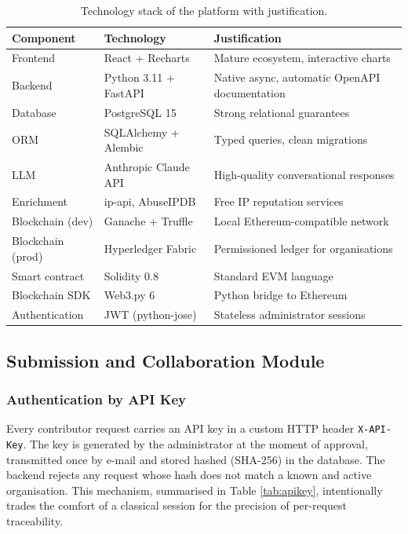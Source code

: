 \documentclass[12pt,a4paper,oneside]{book}
\begin{document}
{{\begin{table}[!h]
\caption{Technology stack of the platform with justification.}
\label{tab:stack}
\centering
\renewcommand{\arraystretch}{1.4}
\begin{tabular}{| C{.20\textwidth} | C{.25\textwidth} | p{.40\textwidth} |}
\hline
\textbf{Component} & \textbf{Technology} & \textbf{Justification} \\
\hline\hline
Frontend         & React + Recharts        & \nohyphens{Mature ecosystem, interactive charts} \\
\hline
Backend          & Python 3.11 + FastAPI   & \nohyphens{Native async, automatic OpenAPI documentation} \\
\hline
Database         & PostgreSQL 15           & \nohyphens{Strong relational guarantees} \\
\hline
ORM              & SQLAlchemy + Alembic    & \nohyphens{Typed queries, clean migrations} \\
\hline
LLM              & Anthropic Claude API    & \nohyphens{High-quality conversational responses} \\
\hline
Enrichment       & ip-api, AbuseIPDB       & \nohyphens{Free IP reputation services} \\
\hline
Blockchain (dev) & Ganache + Truffle       & \nohyphens{Local Ethereum-compatible network} \\
\hline
Blockchain (prod)& Hyperledger Fabric      & \nohyphens{Permissioned ledger for organisations} \\
\hline
Smart contract   & Solidity 0.8            & \nohyphens{Standard EVM language} \\
\hline
Blockchain SDK   & Web3.py 6               & \nohyphens{Python bridge to Ethereum} \\
\hline
Authentication   & JWT (python-jose)       & \nohyphens{Stateless administrator sessions} \\
\hline
\end{tabular}
\end{table}

\subsection{Submission and Collaboration Module}

\subsubsection{Authentication by API Key}
Every contributor request carries an API key in a custom HTTP header
\texttt{X-API-Key}. The key is generated by the administrator at the moment
of approval, transmitted once by e-mail and stored hashed (SHA-256) in the
database. The backend rejects any request whose hash does not match a known
and active organisation. This mechanism, summarised in
Table \ref{tab:apikey}, intentionally trades the comfort of a classical
session for the precision of per-request traceability.

}}
\end{document}
